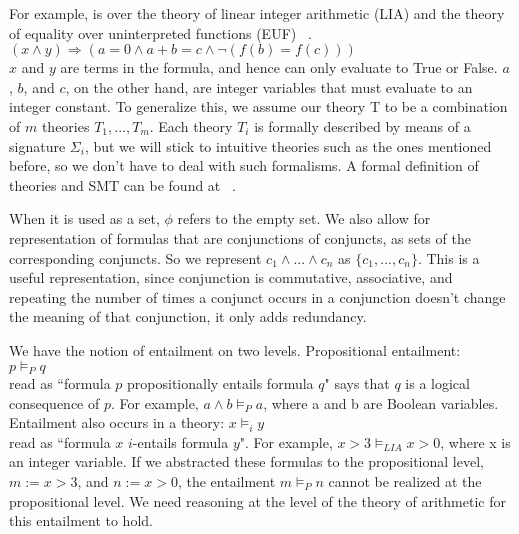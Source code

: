 \documentclass{report}
\begin{document}
For example, is over the theory of linear integer 
arithmetic (LIA) and the theory of 
equality over uninterpreted functions (EUF)
~\cite{LIAEUF}.\\
$(x \land y) \Rightarrow (a = 0 \land a + b = c \land 
\neg (f(b) = f(c)))$ \\
$x$ and $y$ are terms in the 
formula, and hence can only evaluate to True or False.
$a$, $b$, and $c$, on the other hand, are integer variables 
that must evaluate to an integer constant. To generalize 
this, we assume our theory T to be a combination of $m$ 
theories $T_1, ..., T_m$. Each theory $T_i$ is formally 
described by means of a signature $\Sigma_i$, but we 
will stick to intuitive theories such as the ones mentioned 
before, so we don't have to deal with such formalisms. A 
formal definition of theories and SMT can be found at 
~\cite{DBLP:reference/mc/BarrettT18}.

When it is used as a set, $\phi$ refers to the empty set. We also allow for representation of formulas that are 
conjunctions of conjuncts, as sets of the corresponding 
conjuncts. So we represent $c_1 \land ... \land c_n$ as
$\{c_1, ..., c_n\}$. This is a useful representation, 
since conjunction is commutative, associative, and 
repeating the number of times a conjunct occurs in a 
conjunction doesn't change the meaning of that conjunction, 
it only adds redundancy.

We have the notion of entailment on two levels. Propositional 
entailment: \\
$p \models_P q$ \\
read as ``formula $p$ propositionally entails formula $q$" says 
that $q$ is a logical consequence of $p$. For example, 
$a \land b \models_P a$, where a and b are Boolean 
variables. Entailment also occurs in a theory:
$x \models_i y$ \\
read as ``formula $x$ $i$-entails formula $y$". For example, 
$x > 3 \models_{LIA} x > 0$, where x is an integer variable.
If we abstracted these formulas to the propositional level, 
$m := x > 3$, and $n := x > 0$, 
the entailment $m \models_P n$ cannot be realized at the 
propositional level. We need reasoning at the level of 
the theory of arithmetic for this entailment to hold.
\end{document}
